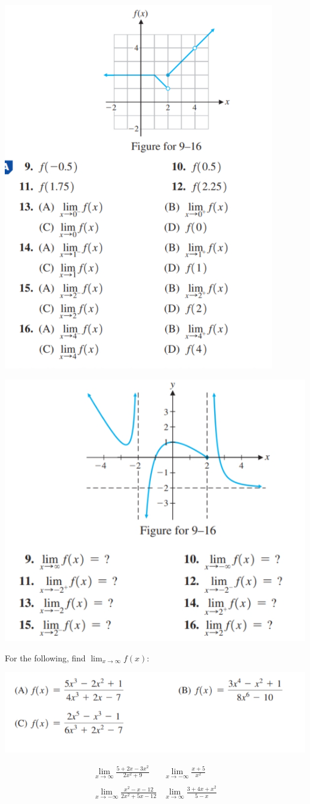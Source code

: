 \documentclass[12pt]{extarticle}
\begin{document}
\begin{center}\includegraphics[width=0.6\linewidth]{9-1-9}\end{center}
\begin{center}\includegraphics[width=0.6\linewidth]{9-2-8}\end{center}

For the following, find $\lim_{x\to \infty}f(x):$
\begin{center}
	\includegraphics[width=0.8\linewidth]{9-2-11}
\end{center}
\begin{align*}
	&\lim_{x \to \infty} \frac{5+2x-3x^2}{2x^2+9} & \lim_{x \to -\infty}\frac{x+5}{x^2}& \\\\
	&\lim_{x \to -\infty} \frac{x^2-x-12}{2x^2+5x-12} & \lim_{x \to \infty}\frac{3+4x+x^2}{5-x}&
\end{align*}
\end{document}
